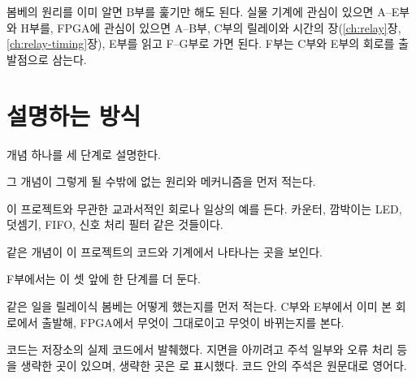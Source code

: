 봄베의 원리를 이미 알면 B부를 훑기만 해도 된다. 실물 기계에 관심이 있으면 A--E부와 H부를, FPGA에 관심이 있으면
A--B부, C부의 릴레이와 시간의 장(\ref{ch:relay}장, \ref{ch:relay-timing}장), E부를 읽고 F--G부로 가면 된다. F부는 C부와 E부의 회로를 출발점으로 삼는다.

\section{설명하는 방식}

개념 하나를 세 단계로 설명한다.

\Why 그 개념이 그렇게 될 수밖에 없는 원리와 메커니즘을 먼저 적는다.

\General 이 프로젝트와 무관한 교과서적인 회로나 일상의 예를 든다. 카운터, 깜박이는 LED, 덧셈기, FIFO,
신호 처리 필터 같은 것들이다.

\Ours 같은 개념이 이 프로젝트의 코드와 기계에서 나타나는 곳을 보인다.

F부에서는 이 셋 앞에 한 단계를 더 둔다.

\Relay 같은 일을 릴레이식 봄베는 어떻게 했는지를 먼저 적는다. C부와 E부에서 이미 본 회로에서 출발해, FPGA에서 무엇이
그대로이고 무엇이 바뀌는지를 본다.

코드는 저장소의 실제 코드에서 발췌했다. 지면을 아끼려고 주석 일부와 오류 처리 등을 생략한 곳이 있으며,
생략한 곳은 로 표시했다. 코드 안의 주석은 원문대로 영어다.

